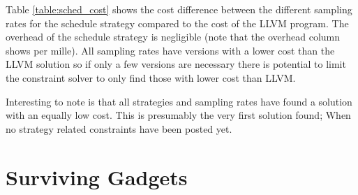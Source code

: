 \begin{table}[h]
		\centering
		\noindent\makebox[\textwidth]{%
			
		}
		\caption{The cost of the different sampling rates for the schedule strategy compared to the LLVM solution.%
		The difference column is the difference between the median cost of the sampling rate and the cost of the LLVM solution.}
		\label{table:sched_cost}
\end{table}

Table \ref{table:sched_cost} shows the cost difference between the different sampling
rates for the schedule strategy compared to the cost of the LLVM program. The overhead of
the schedule strategy is negligible (note that the overhead column shows per mille). All
sampling rates have versions with a lower cost than the LLVM solution so if only a few
versions are necessary there is potential to limit the constraint solver to only find
those with lower cost than LLVM.

Interesting to note is that all strategies and sampling rates have found a solution with
an equally low cost. This is presumably the very first solution found; When no strategy
related constraints have been posted yet.

\section{Surviving Gadgets}

